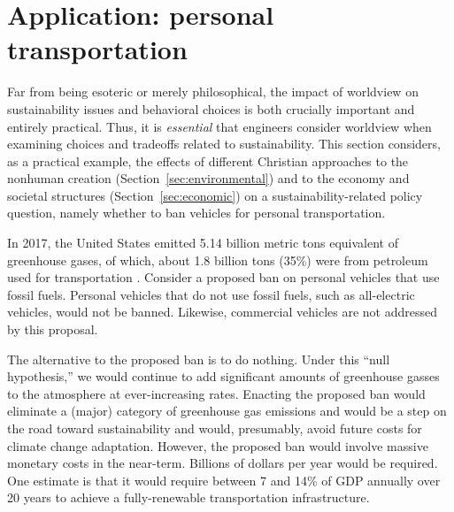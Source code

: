 \documentclass[12pt]{article}
\begin{document}


\section{Application: personal transportation}
\label{sec:personal_transportation}

Far from being esoteric or merely philosophical, 
the impact of worldview on sustainability issues and behavioral choices 
is both crucially important and entirely practical. 
Thus, it is \emph{essential} that engineers consider worldview
when examining choices and tradeoffs related to sustainability.
This section considers, as a practical example, the effects of different Christian approaches
to the nonhuman creation (Section~\ref{sec:environmental}) and
to the economy and societal structures (Section~\ref{sec:economic})
on a sustainability-related policy question, 
namely whether to ban vehicles for personal transportation.

In 2017, the United States emitted 5.14 billion metric tons equivalent of greenhouse gases, 
of which, about 1.8 billion tons (35\%) were from petroleum used for transportation \cite{EIA2017}.
Consider a proposed ban on personal vehicles that use fossil fuels.
Personal vehicles that do not use fossil fuels, such as all-electric vehicles, would not be banned. 
Likewise, commercial vehicles are not addressed by this proposal. %

The alternative to the proposed ban is to do nothing. 
Under this ``null hypothesis,'' 
we would continue to add significant amounts of greenhouse gasses to the atmosphere 
at ever-increasing rates.
Enacting the proposed ban would eliminate a (major) category 
of greenhouse gas emissions and 
would be a step on the road toward sustainability
and would, presumably, avoid future costs for climate change adaptation.
However, the proposed ban would involve massive monetary costs in the near-term. 
Billions of dollars per year would be required. 
One estimate is that it would require between 7 and 14\% of GDP annually 
over 20 years to achieve a fully-renewable transportation infrastructure.
\end{document}
